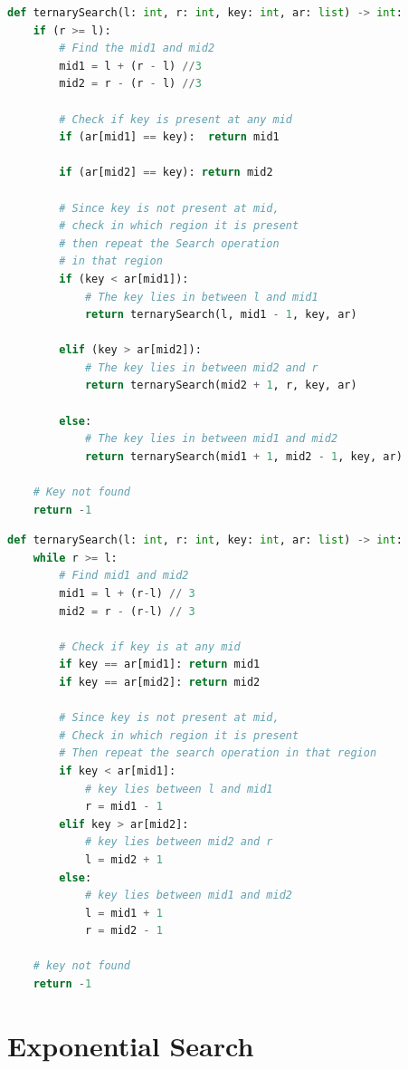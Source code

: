 \begin{lstlisting}[language=Python, caption=Ternary Search (recursive) - Python]
def ternarySearch(l: int, r: int, key: int, ar: list) -> int:
    if (r >= l):
        # Find the mid1 and mid2
        mid1 = l + (r - l) //3
        mid2 = r - (r - l) //3

        # Check if key is present at any mid
        if (ar[mid1] == key):  return mid1
        
        if (ar[mid2] == key): return mid2
        
        # Since key is not present at mid,
        # check in which region it is present
        # then repeat the Search operation
        # in that region
        if (key < ar[mid1]): 
            # The key lies in between l and mid1
            return ternarySearch(l, mid1 - 1, key, ar)
        
        elif (key > ar[mid2]): 
            # The key lies in between mid2 and r
            return ternarySearch(mid2 + 1, r, key, ar)
        
        else: 
            # The key lies in between mid1 and mid2
            return ternarySearch(mid1 + 1, mid2 - 1, key, ar)
        
    # Key not found
    return -1
\end{lstlisting}
\begin{lstlisting}[language=Python, caption=Ternary Search (iterative) - Python]
def ternarySearch(l: int, r: int, key: int, ar: list) -> int:
    while r >= l:
        # Find mid1 and mid2
        mid1 = l + (r-l) // 3
        mid2 = r - (r-l) // 3

        # Check if key is at any mid
        if key == ar[mid1]: return mid1
        if key == ar[mid2]: return mid2

        # Since key is not present at mid, 
        # Check in which region it is present
        # Then repeat the search operation in that region
        if key < ar[mid1]:
            # key lies between l and mid1
            r = mid1 - 1
        elif key > ar[mid2]:
            # key lies between mid2 and r
            l = mid2 + 1
        else:
            # key lies between mid1 and mid2
            l = mid1 + 1
            r = mid2 - 1

    # key not found
    return -1
\end{lstlisting}


\section{Exponential Search \cite{gfg-exponential-search}}\label{Exponential Search}

